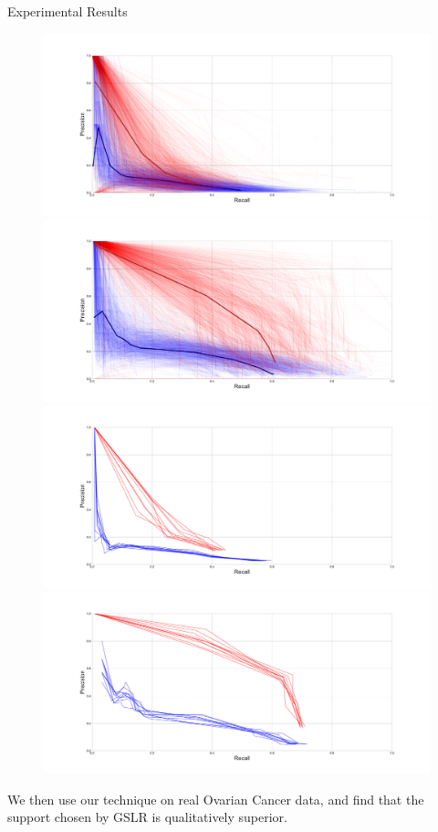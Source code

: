 \documentclass[svgnames,final]{beamer}
\begin{document}
\begin{frame}
\begin{columns}[T]
\begin{column}{.3\linewidth}
\begin{block}{Experimental Results}
		\begin{figure}[h]
		\centering
		  \includegraphics[width=.5\linewidth]{images/2.pdf}
		  \includegraphics[width=.5\linewidth]{images/1.pdf}
    \newline
		  \includegraphics[width=.5\linewidth]{images/4.pdf}
		  \includegraphics[width=.5\linewidth]{images/3.pdf}
		\label{fig:perf}
		\end{figure}

		We then use our technique on real Ovarian Cancer data,
		and find that the support chosen by GSLR is qualitatively superior.


\end{block}
\end{column}
\end{columns}
\end{frame}
\end{document}
